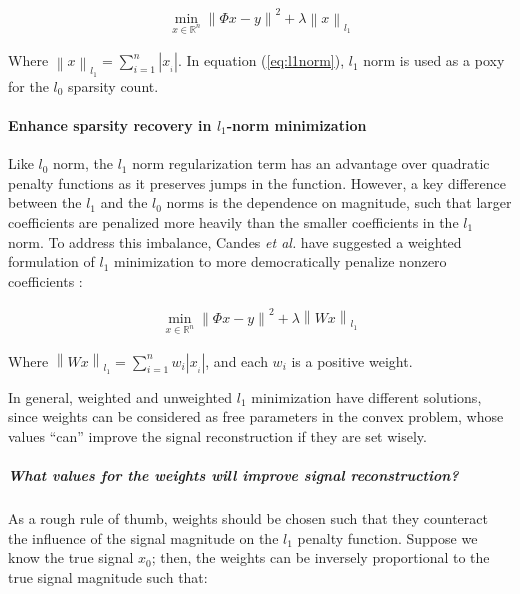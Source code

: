 \begin{equation}
\label{eq:l1norm}
\begin{gathered}
\min_{x\in \mathbb{R}^{n}}\left\|\Phi x-y\right\|^{2} + \lambda \left \|x  \right \|_{l_{1}}
\end{gathered}
\end{equation}

Where $\left \| x \right \|_{l_{1}}=\sum_{i=1}^{n}\left | x_{_{i}} \right |$. In equation (\ref{eq:l1norm}), $l_{1}$ norm is used as a poxy for the $l_{0}$ sparsity count.

\paragraph{Enhance sparsity recovery in $l_{1}$-norm minimization}
\label{section:Enhancel1NormMinimization}

Like $l_{0}$ norm, the $l_{1}$ norm regularization term has an advantage over quadratic penalty functions as it preserves jumps in the function. However, a key difference between the $l_{1}$ and the $l_{0}$ norms is the dependence on magnitude, such that larger coefficients are penalized more heavily than the smaller coefficients in the $l_{1}$ norm. To address this imbalance, Candes \emph{et al.} have suggested a weighted formulation of $l_{1}$ minimization to more democratically penalize nonzero coefficients \cite{candes2008enhancing}:

\begin{equation}
\label{eq:weightedl1norm}
\begin{gathered}
\min_{x\in \mathbb{R}^{n}}\left\|\Phi x-y\right\|^{2} + \lambda \left \|Wx  \right \|_{l_{1}}
\end{gathered}
\end{equation}

Where $\left \| Wx \right \|_{l_{1}}=\sum_{i=1}^{n}w_{i}\left | x_{_{i}} \right |$, and each $w_{i}$ is a positive weight.

In general, weighted and unweighted $l_{1}$ minimization have different solutions, since weights can be considered as free parameters in the convex problem, whose values ``can'' improve the signal reconstruction if they are set wisely.

\subparagraph*{What values for the weights will improve signal reconstruction?}
As a rough rule of thumb, weights should be chosen such that they counteract the influence of the signal magnitude on the $l_{1}$ penalty function. Suppose we know the true signal $x_{0}$; then, the weights can be inversely proportional to the true signal magnitude such that:

